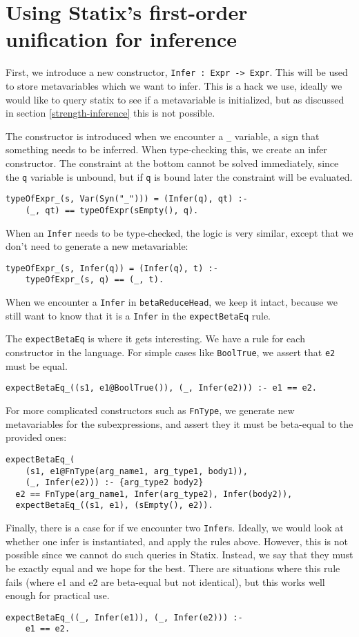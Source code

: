 \section{Using Statix's first-order unification for inference}
\label{statix-inference}

First, we introduce a new constructor, \verb|Infer : Expr -> Expr|. This will be used to store metavariables which we want to infer. This is a hack we use, ideally we would like to query statix to see if a metavariable is initialized, but as discussed in section \ref{strength-inference} this is not possible. 

The constructor is introduced when we encounter a \verb|_| variable, a sign that something needs to be inferred. When type-checking this, we create an infer constructor. The constraint at the bottom cannot be solved immediately, since the \verb|q| variable is unbound, but if \verb|q| is bound later the constraint will be evaluated.

\begin{lstlisting}
typeOfExpr_(s, Var(Syn("_"))) = (Infer(q), qt) :-
	(_, qt) == typeOfExpr(sEmpty(), q).
\end{lstlisting}
When an \verb|Infer| needs to be type-checked, the logic is very similar, except that we don't need to generate a new metavariable:

\begin{lstlisting}
typeOfExpr_(s, Infer(q)) = (Infer(q), t) :-
	typeOfExpr_(s, q) == (_, t).
\end{lstlisting}
When we encounter a \verb|Infer| in \verb|betaReduceHead|, we keep it intact, because we still want to know that it is a \verb|Infer| in the \verb|expectBetaEq| rule. 

The \verb|expectBetaEq| is where it gets interesting. We have a rule for each constructor in the language. For simple cases like \verb|BoolTrue|, we assert that \verb|e2| must be equal.
\begin{lstlisting}
expectBetaEq_((s1, e1@BoolTrue()), (_, Infer(e2))) :- e1 == e2.
\end{lstlisting}
For more complicated constructors such as \verb|FnType|, we generate new metavariables for the subexpressions, and assert they it must be beta-equal to the provided ones:
\begin{lstlisting}
expectBetaEq_(
	(s1, e1@FnType(arg_name1, arg_type1, body1)), 
	(_, Infer(e2))) :- {arg_type2 body2}
  e2 == FnType(arg_name1, Infer(arg_type2), Infer(body2)),
  expectBetaEq_((s1, e1), (sEmpty(), e2)).
\end{lstlisting}

Finally, there is a case for if we encounter two \verb|Infer|s. Ideally, we would look at whether one infer is instantiated, and apply the rules above. However, this is not possible since we cannot do such queries in Statix. Instead, we say that they must be exactly equal and we hope for the best. There are situations where this rule fails (where e1 and e2 are beta-equal but not identical), but this works well enough for practical use.
\begin{lstlisting}
expectBetaEq_((_, Infer(e1)), (_, Infer(e2))) :-
    e1 == e2.
\end{lstlisting}